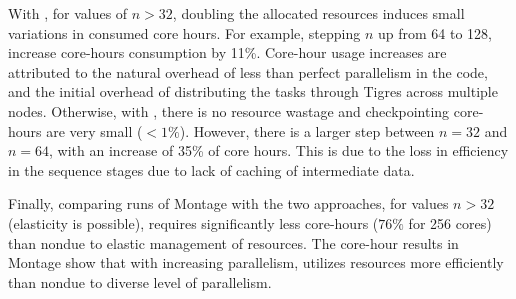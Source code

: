With \systemname, for values of $n>32$, doubling the allocated
resources induces small variations in consumed core hours. For
example, stepping $n$ up from 64 to 128, increase core-hours
consumption by 11\%.  Core-hour usage increases are attributed to the
natural overhead of less than perfect parallelism in the code, and the
initial overhead of distributing the tasks through Tigres across
multiple nodes.  Otherwise, with \systemname, there is no resource
wastage and checkpointing core-hours are very small ($<1\%$).
However, there is a larger step between $n=32$ and $n=64$, with an
increase of 35\% of core hours.  This is due to the loss in efficiency
in the sequence stages due to lack of caching of intermediate data.

Finally, comparing runs of Montage with the two approaches,
for values $n>32$ (elasticity is possible),
\systemname requires significantly less core-hours ($76 \%$ for 256 cores)
than non\systemname due to elastic management of resources.
The core-hour results in Montage show that with increasing
parallelism, \systemname utilizes resources more
efficiently than non\systemname due to diverse level of parallelism.
 



%
%
%



